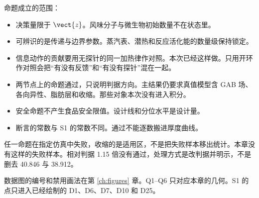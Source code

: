 命题成立的范围：

\begin{itemize}
\item 决策量限于 \(\vect{z}\)。风味分子与微生物初始数量不在状态里。
\item 可辨识的是传递与边界参数。蒸汽表、潜热和反应活化能的数量级保持锁定。
\item 信息动作的贡献要用无探针的同一加热律作对照。本次已经这样做。只用开环作对照会把“有没有反馈”和“有没有探针”混在一起。
\item 两节点上的命题通过，只说明判据方向。主结果仍要求真值模型含 GAB 场、各向异性、脂肪层和收缩。那些对象本次没有进入积分。
\item 安全命题不产生食品安全限值。设计线和分位水平是设计量。
\item 断言的常数与 S1 的常数不同。通过不能逐数搬进厚度曲线。
\end{itemize}

任一命题在指定仿真中失败，收缩的是适用区，不是把失败样本移出统计。本章没有这样的失败样本。相对判据 1.15 倍没有通过，处理方式是改判据并明示，不是删去 40.846 与 38.912。

数据图的编号和禁用画法在第 \ref{ch:figures} 章。Q1--Q6 只对应本章的几何。S1 的点只进入已经绘制的 D1、D6、D7、D10 和 D25。
